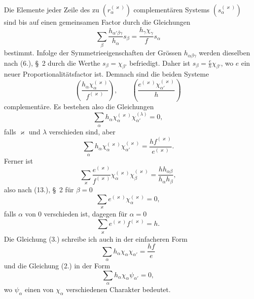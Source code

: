 \documentclass[11pt]{article}
\begin{document}
Die Elemente jeder Zeile des zu $(r_\alpha^{(\varkappa)})$ complementären Systems $(s_\alpha^{(\varkappa)})$ sind bis auf einen gemeinsamen Factor durch die Gleichungen
\[
\sum_\beta \frac{h_{\alpha'\beta\gamma}}{h_\alpha}s_\beta=\frac{h_\gamma\chi_\gamma}{f}s_\alpha
\]
bestimmt. Infolge der Symmetrieeigenschaften der Grössen $h_{\alpha\beta\gamma}$ werden dieselben nach (6.), \S~2 durch die Werthe $s_\beta=\chi_{\beta'}$ befriedigt. Daher ist $s_\beta=\frac{e}{h}\chi_{\beta'}$, wo $e$ ein neuer Proportionalitätsfactor ist. Demnach sind die beiden Systeme
\begin{equation*}\tag{1.}
\left(\frac{h_\alpha\chi_\alpha^{(\varkappa)}}{f^{(\varkappa)}}\right),\qquad
\left(\frac{e^{(\varkappa)}\chi_{\alpha'}^{(\varkappa)}}{h}\right)
\end{equation*}
complementäre. Es bestehen also die Gleichungen
\begin{equation*}\tag{2.}
\sum_\alpha h_\alpha\chi_\alpha^{(\varkappa)}\chi_{\alpha'}^{(\lambda)}=0,
\end{equation*}
falls $\varkappa$ und $\lambda$ verschieden sind, aber
\begin{equation*}\tag{3.}
\sum_\alpha h_\alpha\chi_\alpha^{(\varkappa)}\chi_{\alpha'}^{(\varkappa)}=\frac{h f^{(\varkappa)}}{e^{(\varkappa)}}.
\end{equation*}
Ferner ist
\begin{equation*}\tag{4.}
\sum_\varkappa\frac{e^{(\varkappa)}}{f^{(\varkappa)}}\chi_\alpha^{(\varkappa)}\chi_\beta^{(\varkappa)}=\frac{h h_{\alpha\beta}}{h_\alpha h_\beta},
\end{equation*}
also nach (13.), \S~2 für $\beta=0$
\begin{equation*}\tag{5.}
\sum_\varkappa e^{(\varkappa)}\chi_\alpha^{(\varkappa)}=0,
\end{equation*}
falls $\alpha$ von 0 verschieden ist, dagegen für $\alpha=0$
\begin{equation*}\tag{6.}
\sum_\varkappa e^{(\varkappa)}f^{(\varkappa)}=h.
\end{equation*}
Die Gleichung (3.) schreibe ich auch in der einfacheren Form
\begin{equation*}\tag{7.}
\sum_\alpha h_\alpha\chi_\alpha\chi_{\alpha'}=\frac{hf}{e}
\end{equation*}
und die Gleichung (2.) in der Form
\begin{equation*}\tag{8.}
\sum_\alpha h_\alpha\chi_\alpha\psi_{\alpha'}=0,
\end{equation*}
wo $\psi_\alpha$ einen von $\chi_\alpha$ verschiedenen Charakter bedeutet.
\end{document}
